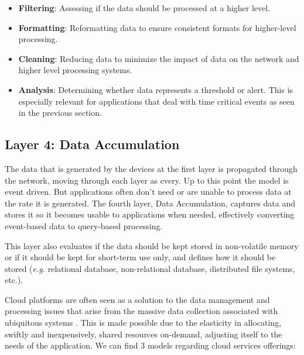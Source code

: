\begin{itemize}
    \item \textbf{Filtering}: Assessing if the data should be processed at a higher level. 
    \item \textbf{Formatting}: Reformatting data to ensure consistent formats for higher-level processing.
    \item \textbf{Cleaning}: Reducing data to minimize the impact of data on the network and higher level processing systems.
    \item \textbf{Analysis}: Determining whether data represents a threshold or alert. This is especially relevant for applications that deal with time critical events as seen in the previous section.
\end{itemize}


\subsection{Layer 4: Data Accumulation}
\label{sec:iot-model-layer4}


The data that is generated by the devices at the first layer is propagated through the network, moving through each layer as every. Up to this point the model is event driven. But applications often don't need or are unable to process data at the rate it is generated. The fourth layer, Data Accumulation, captures data and stores it so it becomes usable to applications when needed, effectively converting event-based data to query-based processing. 

This layer also evaluates if the data should be kept stored in non-volatile memory or if it should be kept for short-term use only, and defines how it should be stored (\textit{e.g.} relational database, non-relational database, distributed file systems, etc.).

Cloud platforms are often seen as a solution to the data management and processing issues that arise from the massive data collection associated with ubiquitous systems \cite{Baker2017}. This is made possible due to the elasticity in allocating, swiftly and inexpensively, shared resources on-demand, adjusting itself to the needs of the application. We can find 3 models regarding cloud services offerings:

